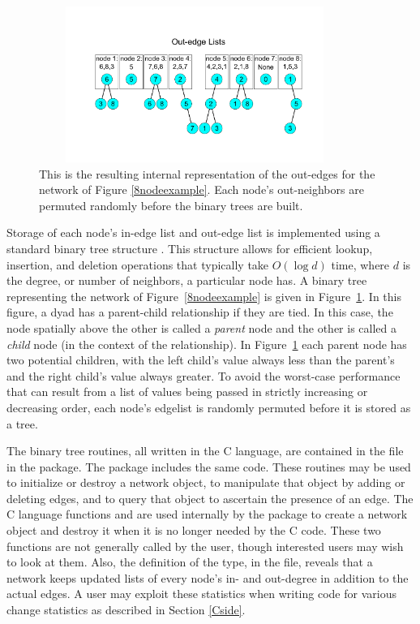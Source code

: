 \documentclass[nojss]{jss}
\begin{document}
\begin{figure}[htb]
\centerline{\includegraphics[height=2in, width=4in]{outedgelists.pdf}}
\caption{This is the resulting internal representation of the out-edges for the network of
Figure \ref{8nodeexample}.  Each node's out-neighbors are permuted randomly
before the binary trees are built.}\label{outedgefig}
\end{figure}

Storage of each node's in-edge list and out-edge list is implemented using a standard
binary tree structure
\cite[Chapter 13]{algorithms}.  This structure allows for efficient lookup, insertion, and deletion
operations that typically take $O(\log d)$ time, where $d$ is the degree, or number of neighbors, a
particular node has.  A binary tree 
representing the network of Figure~\ref{8nodeexample} is given in
Figure~\ref{outedgefig}. In this figure, a dyad has a parent-child relationship if they are tied. In this case, the node spatially above the other is called a
{\it parent} node and the other is called a {\it child} node (in the context of
the relationship).
In Figure~\ref{outedgefig}
each parent node has two potential children, with the left child's value always less than the
parent's and the right child's value always greater.  To avoid the worst-case performance
that can result from a list of values being passed in strictly increasing or decreasing order,
each node's edgelist is randomly permuted before it is stored as a tree.

The binary tree routines, all written in the C language, are contained in the
 file in the  package. The  package
includes the same code.  These routines may be used to initialize or destroy
a network object, to manipulate that object by adding or deleting edges, and to
query that object to ascertain the presence of an edge.
The C language functions  and  
are used internally by the  package to create a network object
and destroy it when it is no longer needed by the C code.  These two functions
are not generally called by the user, though interested users may wish
to look at them.  Also, the definition of the  type, in the
 file, reveals that a network keeps updated lists of every node's
in- and out-degree in addition to the actual edges.  A user may exploit these statistics
when writing code for various change statistics as described in Section \ref{Cside}.
\end{document}
